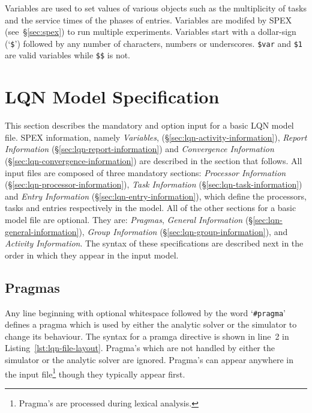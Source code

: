 Variables  are used to set values of various objects such as the multiplicity of
tasks and the service times of the phases of entries.  Variables are modifed by
SPEX (see~\S\ref{sec:spex}) to run multiple experiments.  Variables start with a
dollar-sign (`\texttt{\$}') followed by any number of characters, numbers or underscores.  {\tt \$var} and
{\tt \$1} are valid variables while {\tt \$\$} is not.

\section{LQN Model Specification}
\label{sec:lqn-file-format}

This section describes the mandatory and option input for a basic LQN model file.  SPEX information, namely
\emph{Variables}, (\S\ref{sec:lqn-activity-information}), \emph{Report Information}
(\S\ref{sec:lqn-report-information}) and \emph{Convergence Information}
(\S\ref{sec:lqn-convergence-information}) are described in the section that follows.  All input files are
composed of three mandatory sections: \emph{Processor Information} (\S\ref{sec:lqn-processor-information}),
\emph{Task Information} (\S\ref{sec:lqn-task-information}) and \emph{Entry Information}
(\S\ref{sec:lqn-entry-information}), which define the processors, tasks and entries respectively in the
model.  All of the other sections for a basic model file are optional.  They are: \emph{Pragmas},
\emph{General Information} (\S\ref{sec:lqn-general-information}), \emph{Group Information}
(\S\ref{sec:lqn-group-information}), and \emph{Activity Information}.  The syntax of these specifications
are described next in the order in which they appear in the input model.

\subsection{Pragmas}

Any line beginning with optional whitespace followed by the word `\texttt{\#pragma}'
defines a pragma which is used by either the analytic solver or the simulator to change its behaviour.  The
syntax for a pramga directive is shown in line~2 in Listing~\ref{lst:lqn-file-layout}.  Pragma's which are
not handled by either the simulator or the analytic solver are ignored.  Pragma's can appear anywhere in the
input file\footnote{Pragma's are processed during lexical analysis.}  though they typically appear first.

